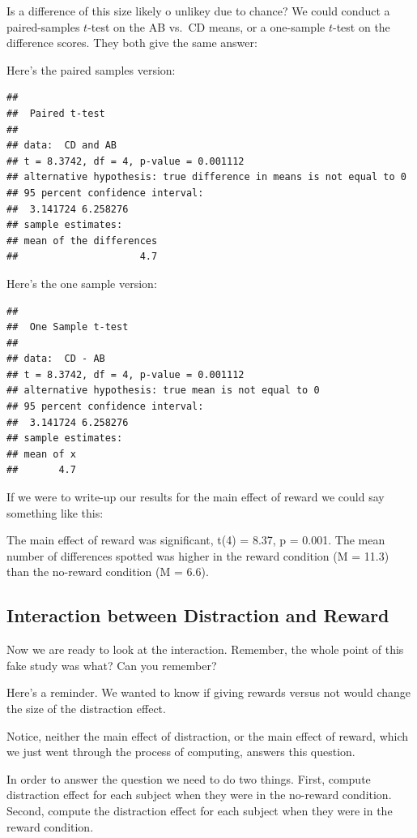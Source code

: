\documentclass[
]{book}
\begin{document}
Is a difference of this size likely o unlikey due to chance? We could conduct a paired-samples \(t\)-test on the AB vs.~CD means, or a one-sample \(t\)-test on the difference scores. They both give the same answer:

Here's the paired samples version:

\begin{verbatim}
## 
## 	Paired t-test
## 
## data:  CD and AB
## t = 8.3742, df = 4, p-value = 0.001112
## alternative hypothesis: true difference in means is not equal to 0
## 95 percent confidence interval:
##  3.141724 6.258276
## sample estimates:
## mean of the differences 
##                     4.7
\end{verbatim}

Here's the one sample version:

\begin{verbatim}
## 
## 	One Sample t-test
## 
## data:  CD - AB
## t = 8.3742, df = 4, p-value = 0.001112
## alternative hypothesis: true mean is not equal to 0
## 95 percent confidence interval:
##  3.141724 6.258276
## sample estimates:
## mean of x 
##       4.7
\end{verbatim}

If we were to write-up our results for the main effect of reward we could say something like this:

The main effect of reward was significant, t(4) = 8.37, p = 0.001. The mean number of differences spotted was higher in the reward condition (M = 11.3) than the no-reward condition (M = 6.6).

\hypertarget{interaction-between-distraction-and-reward}{%
\subsection{Interaction between Distraction and Reward}\label{interaction-between-distraction-and-reward}}

Now we are ready to look at the interaction. Remember, the whole point of this fake study was what? Can you remember?

Here's a reminder. We wanted to know if giving rewards versus not would change the size of the distraction effect.

Notice, neither the main effect of distraction, or the main effect of reward, which we just went through the process of computing, answers this question.

In order to answer the question we need to do two things. First, compute distraction effect for each subject when they were in the no-reward condition. Second, compute the distraction effect for each subject when they were in the reward condition.
\end{document}
